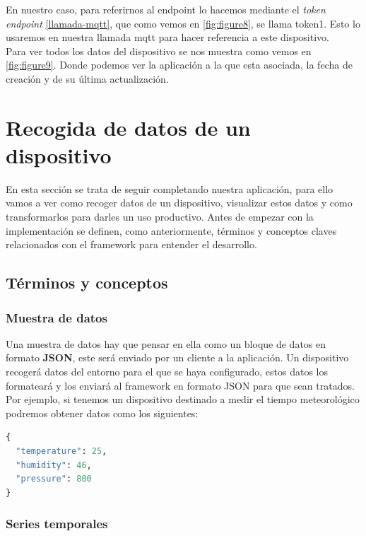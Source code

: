 En nuestro caso, para referirnos al endpoint lo hacemos mediante el \textit{token endpoint} \ref{llamada-mqtt}, que como vemos en \ref{fig:figure8}, se llama token1. Esto lo usaremos en nuestra llamada mqtt para hacer referencia a este dispositivo.\\

Para ver todos los datos del dispositivo se nos muestra como vemos en \ref{fig:figure9}. Donde podemos ver la aplicación a la que esta asociada, la fecha de creación y de su última actualización.

\newpage


\section{Recogida de datos de un dispositivo}

En esta sección se trata de seguir completando nuestra aplicación, para ello vamos a ver como recoger datos de un dispositivo, visualizar estos datos y como transformarlos para darles un uso productivo. Antes de empezar con la implementación se definen, como anteriormente, términos y conceptos claves relacionados con el framework para entender el desarrollo. \cite{kaaiotCollectData}

\subsection{Términos y conceptos}

\subsubsection{Muestra de datos}

Una muestra de datos hay que pensar en ella como un bloque de datos en formato \textbf{JSON}, este será enviado por un cliente a la aplicación. Un dispositivo recogerá datos del entorno para el que se haya configurado, estos datos los formateará y los enviará al framework en formato JSON para que sean tratados. Por ejemplo, si tenemos un dispositivo destinado a medir el tiempo meteorológico podremos obtener datos como los siguientes:

\begin{lstlisting}[language=Python]
{
  "temperature": 25,
  "humidity": 46,
  "pressure": 800
}
\end{lstlisting}

\subsubsection{Series temporales}

